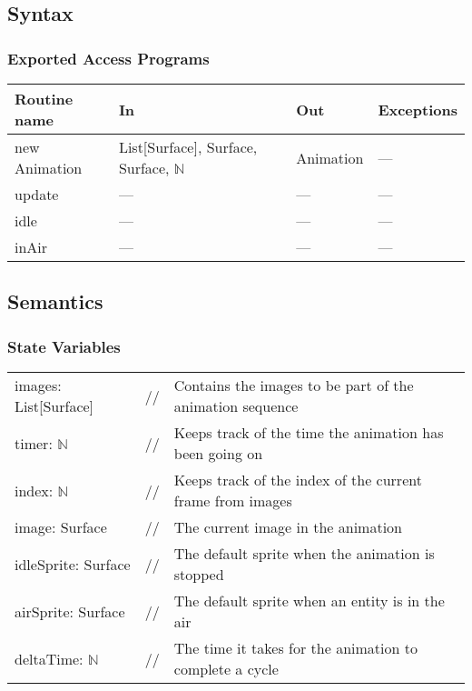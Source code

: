 \documentclass[12pt]{article}
\begin{document}
\subsection* {Syntax}

\subsubsection* {Exported Access Programs}

\begin{tabular}{| l | l | l | l |}
\hline
\textbf{Routine name} & \textbf{In} & \textbf{Out} & \textbf{Exceptions}\\
\hline
new Animation & List[Surface], Surface, Surface, $\mathbb{N}$ & Animation & ---\\
\hline
update & --- & --- & ---\\
\hline
idle & --- & --- & ---\\
\hline
inAir & --- & --- & ---\\
\hline
\end{tabular}

\subsection* {Semantics}

\subsubsection* {State Variables}

\begin{tabular}{lll}
    images: List[Surface] & // & Contains the images to be part of the animation sequence\\
    timer: $\mathbb{N}$ & // & Keeps track of the time the animation has been going on\\
    index: $\mathbb{N}$ & // & Keeps track of the index of the current frame from images\\
    image: Surface & // & The current image in the animation\\
    idleSprite: Surface & // & The default sprite when the animation is stopped\\
    airSprite: Surface & // & The default sprite when an entity is in the air\\
    deltaTime: $\mathbb{N}$ & // & The time it takes for the animation to complete a cycle\\
\end{tabular}
\end{document}
